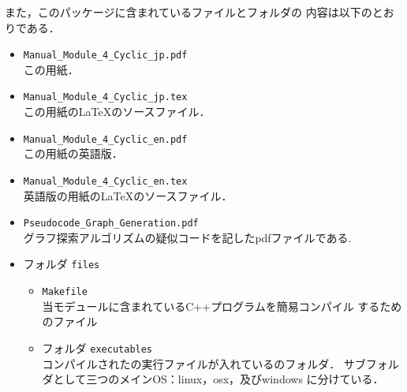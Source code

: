 \documentclass[11pt,titlepage,dvipdfmx,twoside]{jarticle}
\begin{document}
また，このパッケージに含まれているファイルとフォルダの
内容は以下のとおりである．
%
\begin{itemize}
 \item {\tt Manual\_Module\_4\_Cyclic\_jp.pdf}\\
  この用紙．
 \item {\tt Manual\_Module\_4\_Cyclic\_jp.tex}\\
  この用紙の\LaTeX のソースファイル．
 \item {\tt Manual\_Module\_4\_Cyclic\_en.pdf}\\
  この用紙の英語版．
 \item {\tt Manual\_Module\_4\_Cyclic\_en.tex}\\
 英語版の用紙の\LaTeX のソースファイル．
\item{ {\tt Pseudocode\_Graph\_Generation.pdf}}\\
 グラフ探索アルゴリズムの疑似コードを記したpdfファイルである.
 
 \item フォルダ {\tt files}
 \begin{itemize}
 \item {\tt Makefile} \\
    当モデュールに含まれているC++プログラムを簡易コンパイル
    するためのファイル
    
    \item フォルダ {\tt executables}\\
    コンパイルされたの実行ファイルが入れているのフォルダ．
    サブフォルダとして三つのメインOS：linux，osx，及びwindows
    に分けている．
 

\end{itemize}
\end{itemize}
\end{document}
